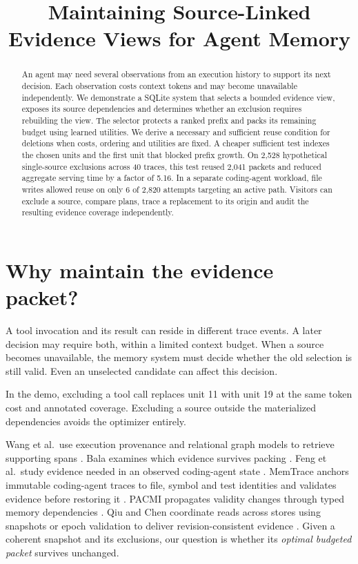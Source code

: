 \documentclass[conference]{IEEEtran}
\title{Maintaining Source-Linked Evidence Views for Agent Memory}
\author{}
\begin{document}
\maketitle
\begin{abstract}
An agent may need several observations from an execution history to support its next decision. Each observation costs context tokens and may become unavailable independently. We demonstrate a SQLite system that selects a bounded evidence view, exposes its source dependencies and determines whether an exclusion requires rebuilding the view. The selector protects a ranked prefix and packs its remaining budget using learned utilities. We derive a necessary and sufficient reuse condition for deletions when costs, ordering and utilities are fixed. A cheaper sufficient test indexes the chosen units and the first unit that blocked prefix growth. On 2,528 hypothetical single-source exclusions across 40 traces, this test reused 2,041 packets and reduced aggregate serving time by a factor of 5.16. In a separate coding-agent workload, file writes allowed reuse on only 6 of 2,820 attempts targeting an active path. Visitors can exclude a source, compare plans, trace a replacement to its origin and audit the resulting evidence coverage independently.
\end{abstract}

\section{Why maintain the evidence packet?}

A tool invocation and its result can reside in different trace events. A later decision may require both, within a limited context budget. When a source becomes unavailable, the memory system must decide whether the old selection is still valid. Even an unselected candidate can affect this decision.

In the demo, excluding a tool call replaces unit 11 with unit 19 at the same token cost and annotated coverage. Excluding a source outside the materialized dependencies avoids the optimizer entirely.

Wang et al.\ use execution provenance and relational graph models to retrieve supporting spans \cite{wang}. Bala examines which evidence survives packing \cite{bala}. Feng et al.\ study evidence needed in an observed coding-agent state \cite{feng}. MemTrace anchors immutable coding-agent traces to file, symbol and test identities and validates evidence before restoring it \cite{memtrace}. PACMI propagates validity changes through typed memory dependencies \cite{pacmi}. Qiu and Chen coordinate reads across stores using snapshots or epoch validation to deliver revision-consistent evidence \cite{readboundaries}. Given a coherent snapshot and its exclusions, our question is whether its \emph{optimal budgeted packet} survives unchanged.
\end{document}
